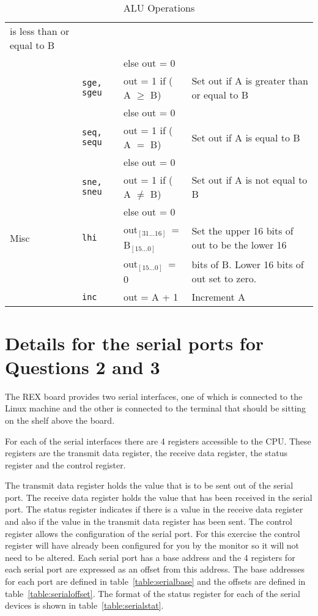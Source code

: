 \documentclass[a4paper,10pt]{article}
\begin{document}
\begin{table}[h]
\begin{center}
\begin{tabular}{|l|l|l|p{75mm}|}
is less than or equal to B\\
& & else out = 0 & \\
\cline{2-4}
& \texttt{sge, sgeu} & out = 1 if ( A $\ge$ B) & Set out if A
is greater than or equal to B\\
& & else out = 0 & \\
\cline{2-4}
& \texttt{seq, sequ} & out = 1 if ( A $=$ B) & Set out if A
is equal to B \\
& & else out = 0 & \\
\cline{2-4}
& \texttt{sne, sneu} & out = 1 if ( A $\neq$ B) & Set out if A
is not equal to B \\
& & else out = 0 & \\
\hline
Misc & \texttt{lhi} & out\tiny$_{[31...16]}$\normalsize~= B\tiny$_{[15...0]}$ &
Set the upper 16 bits of out to be the lower 16 \\
& & out\tiny$_{[15...0]}$\normalsize~= 0 & bits of B. Lower 16 bits of out set to zero. \\ 
\cline{2-4}
& \texttt{inc} & out = A + 1 & Increment A\\
\hline
\end{tabular}
\end{center}
\caption{ALU Operations}
\label{table:alu}
\end{table}




\newpage
\section{Details for the serial ports for Questions 2 and 3}
\label{org_sp_defn}



The REX board provides two serial interfaces, one of which is
connected to the Linux machine and the other is connected to the
terminal that should be sitting on the shelf above the board. 

For each of the serial interfaces there are 4 registers accessible to
the CPU. These registers are the transmit data register, the receive
data register, the status register and the control register.

The transmit data register holds the value that is to be sent out of
the serial port. The receive data register holds the value that has
been received in the serial port. The status register indicates if
there is a value in the receive data register and also if the value in
the transmit data register has been sent. The control register allows
the configuration of the serial port. For this exercise the control
register will have already been configured for you by the monitor so
it will not need to be altered. Each serial port has a base address
and the 4 registers for each serial port are expressed as an offset
from this address. The base addresses for each port are defined in
table~\ref{table:serialbase} and the offsets are defined in
table~\ref{table:serialoffset}. The format of the status register for
each of the serial devices is shown in table~\ref{table:serialstat}.
\end{document}
